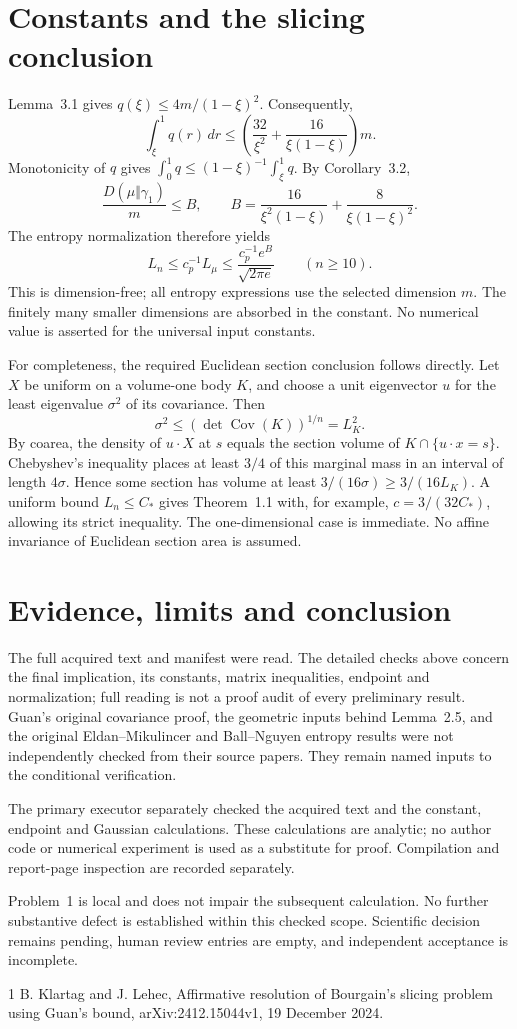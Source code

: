 \documentclass[10pt]{article}
\begin{document}
\section*{Constants and the slicing conclusion}
Lemma 3.1 gives \(q(\xi)\le4m/(1-\xi)^2\). Consequently, \[\int_\xi^1 q(r)\,dr
 \le \left(\frac{32}{\xi^2}
          +\frac{16}{\xi(1-\xi)}\right)m .\] Monotonicity of \(q\) gives \(\int_0^1q\le(1-\xi)^{-1}\int_\xi^1q\). By Corollary 3.2, \[\frac{D(\mu\Vert\gamma_1)}m\le B,\qquad
 B=\frac{16}{\xi^2(1-\xi)}
   +\frac{8}{\xi(1-\xi)^2}.\] The entropy normalization therefore yields \[L_n\le c_p^{-1}L_\mu
       \le \frac{c_p^{-1}e^B}{\sqrt{2\pi e}}
       \qquad(n\ge10).\] This is dimension-free; all entropy expressions use the selected dimension \(m\). The finitely many smaller dimensions are absorbed in the constant. No numerical value is asserted for the universal input constants.\par
For completeness, the required Euclidean section conclusion follows directly. Let \(X\) be uniform on a volume-one body \(K\), and choose a unit eigenvector \(u\) for the least eigenvalue \(\sigma^2\) of its covariance. Then \[\sigma^2\le(\det\operatorname{Cov}(K))^{1/n}=L_K^2.\] By coarea, the density of \(u\cdot X\) at \(s\) equals the section volume of \(K\cap\{u\cdot x=s\}\). Chebyshev’s inequality places at least \(3/4\) of this marginal mass in an interval of length \(4\sigma\). Hence some section has volume at least \(3/(16\sigma)\ge3/(16L_K)\). A uniform bound \(L_n\le C_*\) gives Theorem 1.1 with, for example, \(c=3/(32C_*)\), allowing its strict inequality. The one-dimensional case is immediate. No affine invariance of Euclidean section area is assumed.\par
\section*{Evidence, limits and conclusion}
The full acquired text and manifest were read. The detailed checks above concern the final implication, its constants, matrix inequalities, endpoint and normalization; full reading is not a proof audit of every preliminary result. Guan’s original covariance proof, the geometric inputs behind Lemma 2.5, and the original Eldan–Mikulincer and Ball–Nguyen entropy results were not independently checked from their source papers. They remain named inputs to the conditional verification.\par
The primary executor separately checked the acquired text and the constant, endpoint and Gaussian calculations. These calculations are analytic; no author code or numerical experiment is used as a substitute for proof. Compilation and report-page inspection are recorded separately.\par
Problem 1 is local and does not impair the subsequent calculation. No further substantive defect is established within this checked scope. Scientific decision remains pending, human review entries are empty, and independent acceptance is incomplete.\par
1 B. Klartag and J. Lehec, Affirmative resolution of Bourgain’s slicing problem using Guan’s bound, arXiv:2412.15044v1, 19 December 2024.\par
\end{document}
